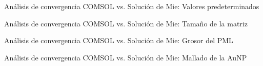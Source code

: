 
\begin{frame}{Análisis de convergencia}
{COMSOL vs. Solución de Mie: Valores predeterminados}\small
\begin{figure}
 	\centering
     \def\svgwidth{.9\textwidth}
\end{figure}
\end{frame}
%
%
\begin{frame}{Análisis de convergencia}
{COMSOL vs. Solución de Mie: Tamaño de la matriz}\small
\begin{figure}
	\centering
     \def\svgwidth{.8\textwidth}
\end{figure}
\end{frame}


\begin{frame}{Análisis de convergencia}
{COMSOL vs. Solución de Mie: Grosor del PML}\small
\begin{figure}
	\centering
     \def\svgwidth{.8\textwidth}
\end{figure}
\end{frame}

\begin{frame}{Análisis de convergencia \hyperlink{fr:Apoyo}{\beamerreturnbutton{}}}
{COMSOL vs. Solución de Mie: Mallado de la AuNP}\small
\begin{figure}
	\centering
     \def\svgwidth{.8\textwidth}
\end{figure}
\end{frame}

